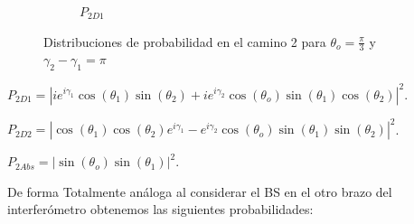 \documentclass[11pt]{article}
\begin{document}
\begin{figure}[h!]
\begin{subfigure}[b]{0.45\linewidth}
\caption{$P_{2D1}$}
\label{fig:BS2}
\end{subfigure}
\caption{Distribuciones de probabilidad en el camino 2 para $\theta_{o}=\frac{\pi}{3}$ y $\gamma_{2}-\gamma_{1}=\pi$}
\label{fig:westminster}
\end{figure} 



$P_{2D1}=|ie^{i\gamma_{1}}\cos(\theta_{1})\sin(\theta_{2})+i e^{i\gamma_{2}}\cos(\theta_{o}) \sin(\theta_{1})\cos(\theta_{2})|^2$.

\vspace{0.1cm}

$P_{2D2}=|\cos(\theta_{1})\cos(\theta_{2})e^{i\gamma_{1}}- e^{i\gamma_{2}}\cos(\theta_{o}) \sin(\theta_{1})\sin(\theta_{2})|^2$.

\vspace{0.1cm}

$P_{2Abs}=|\sin(\theta_{o}) \sin(\theta_{1})|^2$.

\vspace{0.3cm}

De forma Totalmente análoga al considerar el BS en el otro brazo del interferómetro obtenemos las siguientes probabilidades:
\end{document}
